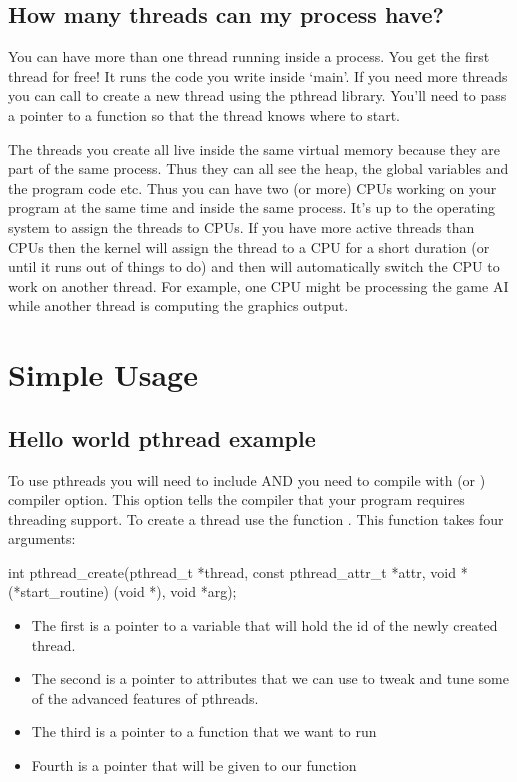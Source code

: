 \subsection{How many threads can my process have?}\label{how-many-threads-can-my-process-have}

You can have more than one thread running inside a process. You get the first thread for free! It runs the code you write inside `main'. If you need more threads you can call  to create a new thread using the pthread library. You'll need to pass a pointer to a function so that the thread knows where to start.

The threads you create all live inside the same virtual memory because they are part of the same process. Thus they can all see the heap, the global variables and the program code etc. Thus you can have two (or more) CPUs working on your program at the same time and inside the same process. It's up to the operating system to assign the threads to CPUs. If you have more active threads than CPUs then the kernel will assign the thread to a CPU for a short duration (or until it runs out of things to do) and then will automatically switch the CPU to work on another thread. For example, one CPU might be processing the game AI while another thread is computing the graphics output.

\section{Simple Usage}\label{simple-usage}

\subsection{Hello world pthread example}\label{hello-world-pthread-example}

To use pthreads you will need to include  AND you need to compile with  (or ) compiler option. This option tells the compiler that your program requires threading support. To create a thread use the function . This function takes four arguments:

\begin{code}[language=C]
int pthread_create(pthread_t *thread, const pthread_attr_t *attr,
                   void *(*start_routine) (void *), void *arg);
\end{code}

\begin{itemize}
\tightlist
\item
  The first is a pointer to a variable that will hold the id of the newly created thread.
\item
  The second is a pointer to attributes that we can use to tweak and tune some of the advanced features of pthreads.
\item
  The third is a pointer to a function that we want to run
\item
  Fourth is a pointer that will be given to our function
\end{itemize}

